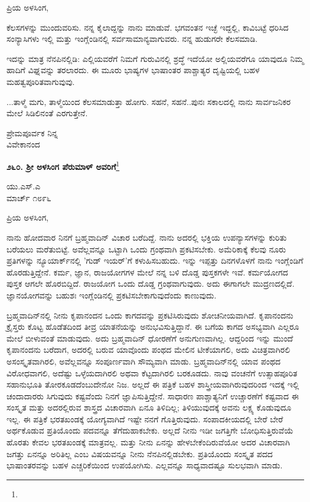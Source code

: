 \noindent
ಪ್ರಿಯ ಅಳಸಿಂಗ,

ಕೆಲಸಗಳನ್ನು ಮುಂದುವರಿಸು. ನನ್ನ ಕೈಲಾದ್ದನ್ನು ನಾನು ಮಾಡುವೆ. ಭಗವಂತನ ಇಚ್ಛೆ ಇದ್ದಲ್ಲಿ, ಕಾವಿಬಟ್ಟೆ ಧರಿಸಿದ ಸಂನ್ಯಾಸಿಗಳು ಇಲ್ಲಿ ಮತ್ತು ಇಂಗ್ಲೆಂಡಿನಲ್ಲಿ ಸರ್ವಸಾಮಾನ್ಯವಾಗುವರು. ನನ್ನ ಹುಡುಗರೇ ಕೆಲಸಮಾಡಿ.

ಇದನ್ನು ಮಾತ್ರ ನೆನಪಿನಲ್ಲಿಡಿ: ಎಲ್ಲಿಯವರೆಗೆ ನಿಮಗೆ ಗುರುವಿನಲ್ಲಿ ಶ್ರದ್ಧೆ ಇದೆಯೋ ಅಲ್ಲಿಯವರೆಗೂ ಯಾವುದೂ ನಿಮ್ಮ ಹಾದಿಗೆ ವಿಘ್ನವನ್ನು ತರಲಾರದು. ಈ ಮೂರು ಭಾಷ್ಯಗಳ ಭಾಷಾಂತರ ಪಾಶ್ಚಾತ್ಯರ ದೃಷ್ಟಿಯಲ್ಲಿ ಬಹಳ ಮಹತ್ವಪೂರಿತವಾಗುವುವು.

...ತಾಳ್ಮೆ ಮಗು, ತಾಳ್ಮೆಯಿಂದ ಕೆಲಸಮಾಡುತ್ತಾ ಹೋಗು. ಸಹನೆ, ಸಹನೆ..ಪುನಃ ಸಕಾಲದಲ್ಲಿ ನಾನು ಸಾರ್ವಜನಿಕರ ಮೇಲೆ ಸಿಡಿಲಿನಂತೆ ಎರಗುತ್ತೇನೆ.

{\flushright
ಪ್ರೇಮಪೂರ್ವಕ ನಿನ್ನ\\ವಿವೇಕಾನಂದ\par}

\begin{center}
\textbf{೨೬೦. ಶ‍್ರೀ ಅಳಸಿಂಗ ಪೆರುಮಾಳ್ ಅವರಿಗೆ}\footnote{}
\end{center}

\begin{flushright}
ಯು.ಎಸ್.ಎ\\ಮಾರ್ಚ್ ೧೮೯೬
\end{flushright}

\noindent
ಪ್ರಿಯ ಅಳಸಿಂಗ,

ನಾನು ಹೋದವಾರ ನಿನಗೆ ಬ್ರಹ್ಮವಾದಿನ್ ವಿಚಾರ ಬರೆದಿದ್ದೆ. ನಾನು ಅದರಲ್ಲಿ ಭಕ್ತಿಯ ಉಪನ್ಯಾಸಗಳನ್ನು ಕುರಿತು ಬರೆಯಲು ಮರೆತುಬಿಟ್ಟೆ. ಅವೆಲ್ಲವನ್ನೂ ಒಟ್ಟಾಗಿ ಒಂದು ಗ್ರಂಥವಾಗಿ ಪ್ರಕಟಿಸಬೇಕು. ಅಮೆರಿಕಾಕ್ಕೆ ಕೆಲವು ನೂರು ಪ್ರತಿಗಳನ್ನು ನ್ಯೂಯಾರ್ಕ್‌ನಲ್ಲಿ ’ಗುಡ್ ಇಯರ್’ಗೆ ಕಳುಹಿಸಬಹುದು. ಇನ್ನು ಇಪ್ಪತ್ತು ದಿನಗಳೊಳಗೆ ನಾನು ಇಂಗ್ಲೆಂಡಿಗೆ ಹೊರಡುತ್ತಿದ್ದೇನೆ. ಕರ್ಮ, ಜ್ಞಾನ, ರಾಜಯೋಗಗಳ ಮೇಲೆ ನನ್ನ ಬಳಿ ದೊಡ್ಡ ಪುಸ್ತಕಗಳೇ ಇವೆ. ಕರ್ಮಯೋಗದ ಪುಸ್ತಕ ಆಗಲೇ ಹೊರಬಿದ್ದಿದೆ. ರಾಜಯೋಗ ಒಂದು ದೊಡ್ಡ ಗ್ರಂಥವಾಗುವುದು. ಅದು ಈಗಾಗಲೇ ಮುದ್ರಣದಲ್ಲಿದೆ. ಜ್ಞಾನಯೋಗವನ್ನು ಬಹುಶಃ ಇಂಗ್ಲೆಂಡಿನಲ್ಲಿ ಪ್ರಕಟಿಸಬೇಕಾಗುವುದೆಂದು ಕಾಣುವುದು.

ಬ್ರಹ್ಮವಾದಿನ್‌ನಲ್ಲಿ ನೀನು ಕೃಪಾನಂದನ ಒಂದು ಕಾಗದವನ್ನು ಪ್ರಕಟಿಸಿರುವುದು ಶೋಚನೀಯವಾಗಿದೆ. ಕೃಪಾನಂದನು ಕ್ರೈಸ್ತರು ಕೊಟ್ಟ ಹೊಡೆತದಿಂದ ತೀವ್ರ ಯಾತನೆಯನ್ನು ಅನುಭವಿಸುತ್ತಿದ್ದಾನೆ. ಈ ಬಗೆಯ ಕಾಗದ ಅಸಭ್ಯವಾಗಿ ಎಲ್ಲರೂ ಮೇಲೆ ಬೀಳುವಂತೆ ಮಾಡುವುದು. ಅದು ಬ್ರಹ್ಮವಾದಿನ್ ಧೋರಣೆಗೆ ಅನುಗುಣವಾಗಿಲ್ಲ. ಆದ್ದರಿಂದ ಇನ್ನು ಮುಂದೆ ಕೃಪಾನಂದನು ಬರೆದಾಗ, ಅದರಲ್ಲಿ ಬರುವ ಯಾವೊಂದು ಪಂಥದ ಮೇಲಿನ ಟೀಕೆಯಾಗಲಿ, ಅದು ವಿಚಿತ್ರವಾಗಿರಲಿ ಅಸಂಸ್ಕೃತವಾಗಿರಲಿ, ಅವೆಲ್ಲವನ್ನೂ ಸಂಪೂರ್ಣವಾಗಿ ಸೌಮ್ಯವಾಗಿ ಮಾಡು. ಬ್ರಹ್ಮವಾದಿನ್‌ನಲ್ಲಿ ಯಾವ ಪಂಥದ ವಿರೋಧವಾಗಲಿ, ಅದೆಷ್ಟು ಒಳ್ಳೆಯದಾಗಿರಲಿ ಅಥವಾ ಕೆಟ್ಟದಾಗಿರಲಿ ಬರಕೂಡದು. ನಾವು ವಂಚನೆಗೆ ಉತ್ಸಾಹಪೂರಿತ ಸಹಾನುಭೂತಿ ತೋರಕೂಡದೆಂಬುದೇನೋ ನಿಜ. ಅಲ್ಲದೆ ಈ ಪತ್ರಿಕೆ ಬಹಳ ಶಾಸ್ತ್ರೀಯವಾಗಿರುವುದರಿಂದ ಇದಕ್ಕೆ ಇಲ್ಲಿ ಚಂದಾದಾರರು ಸಿಗುವುದು ಕಷ್ಟವೆಂದು ನಿನಗೆ ಜ್ಞಾಪಿಸುತ್ತಿದ್ದೇನೆ. ಸಾಧಾರಣ ಪಾಶ್ಚಾತ್ಯನಿಗೆ ಉಚ್ಚಾರಣೆಗೆ ಕಷ್ಟವಾದ ಈ ಸಂಸ್ಕೃತ ಮತ್ತು ಅದರಲ್ಲಿರುವ ಶಾಸ್ತ್ರದ ವಿಚಾರವಾಗಿ ಏನೂ ತಿಳಿದಿಲ್ಲ; ತಿಳಿಯುವುದಕ್ಕೆ ಅವನು ಲಕ್ಷ್ಯ ಕೊಡುವುದೂ ಇಲ್ಲ. ಈ ಪತ್ರಿಕೆ ಭರತಖಂಡಕ್ಕೆ ಯೋಗ್ಯವಾಗಿದೆ\enginline{-} ಇಷ್ಟೇ ನನಗೆ ಗೊತ್ತಿರುವುದು. ಸಂಪಾದಕೀಯದಲ್ಲಿ ಬೇರೆ ಬೇರೆ ಅರ್ಥಕೊಡುವ ಪ್ರತಿಯೊಂದು ಪದವನ್ನೂ ತೆಗೆದುಹಾಕಬೇಕು. ಅಲ್ಲದೆ ನೀನು ಇಡೀ ಜಗತ್ತಿಗೇ ಬೋಧಿಸುತ್ತಿರುವೆಯೆ ಹೊರತು ಕೇವಲ ಭರತಖಂಡಕ್ಕೆ ಮಾತ್ರವಲ್ಲ. ಮತ್ತು ನೀನು ಏನನ್ನು ಹೇಳಬೇಕೆಂದಿರುವೆಯೋ ಅದರ ವಿಚಾರವಾಗಿ ಜಗತ್ತು ಏನನ್ನೂ ಅರಿತಿಲ್ಲ ಎಂಬ ವಿಷಯವನ್ನೂ ನೀನು ನೆನಪಿನಲ್ಲಿಡಬೇಕು. ಪ್ರತಿಯೊಂದು ಸಂಸ್ಕೃತ ಪದದ ಭಾಷಾಂತರವನ್ನು ಬಹಳ ಎಚ್ಚರಿಕೆಯಿಂದ ಉಪಯೋಗಿಸು. ಎಲ್ಲವನ್ನೂ ಸಾಧ್ಯವಾದಷ್ಟೂ ಸುಲಭವಾಗಿ ಮಾಡು.

